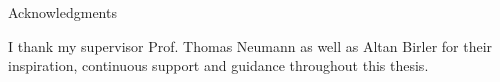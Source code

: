 \thispagestyle{empty}

\vspace*{20mm}

\begin{center}
    { Acknowledgments}
\end{center}

\vspace{10mm}

I thank my supervisor Prof. Thomas Neumann as well as Altan Birler for their inspiration, continuous support and guidance throughout this thesis.

\cleardoublepage{}
